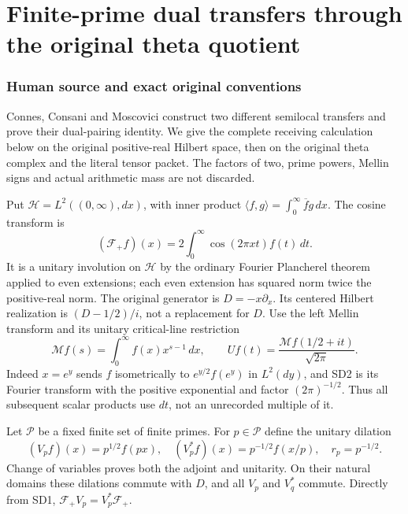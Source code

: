 \endgroup

\clearpage\begingroup
\part*{Finite-prime dual transfers through the original theta quotient}
\newcommand{\swdualC}{\mathbb C}
\newcommand{\swdualB}{\mathscr B}
\newcommand{\swdualM}{\mathcal M}
\newcommand{\swdualF}{\mathcal F_+}


\section{Human source and exact original conventions}
Connes, Consani and Moscovici \cite[Propositions groundstate,
sonintensor and groundstatedual; Theorem isosonin]{swdual:CCM} construct two
different semilocal transfers and prove their dual-pairing identity.
We give the complete receiving calculation below on the original
positive-real Hilbert space, then on the original theta complex and
the literal tensor packet. The factors of two, prime powers, Mellin
signs and actual arithmetic mass are not discarded.

Put $\mathcal H=L^2((0,\infty),dx)$, with inner product
$\langle f,g\rangle=\int_0^\infty\overline f g\,dx$.
The cosine transform is
\[
 (\swdualF f)(x)=2\int_0^\infty\cos(2\pi xt)f(t)\,dt.
                                                               \tag{SD1}
\]
It is a unitary involution on $\mathcal H$ by the ordinary Fourier
Plancherel theorem applied to even extensions; each even extension
has squared norm twice the positive-real norm. The original generator
is $D=-x\partial_x$. Its centered Hilbert realization is
$(D-1/2)/i$, not a replacement for $D$.
Use the left Mellin transform and its unitary critical-line restriction
\[
 \swdualM f(s)=\int_0^\infty f(x)x^{s-1}\,dx,\qquad
 Uf(t)=\frac{\swdualM f(1/2+it)}{\sqrt{2\pi}}.                       \tag{SD2}
\]
Indeed $x=e^y$ sends $f$ isometrically to $e^{y/2}f(e^y)$ in
$L^2(dy)$, and SD2 is its Fourier transform with the positive
exponential and factor $(2\pi)^{-1/2}$. Thus all subsequent scalar
products use $dt$, not an unrecorded multiple of it.

Let $\mathcal P$ be a fixed finite set of finite primes. For $p\in
\mathcal P$ define the unitary dilation
\[
 (V_pf)(x)=p^{1/2}f(px),\quad
 (V_p^*f)(x)=p^{-1/2}f(x/p),\quad r_p=p^{-1/2}.
                                                               \tag{SD3}
\]
Change of variables proves both the adjoint and unitarity. On their
natural domains these dilations commute with $D$, and all $V_p$ and
$V_q^*$ commute. Directly from SD1, $\swdualF V_p=V_p^*\swdualF$.


